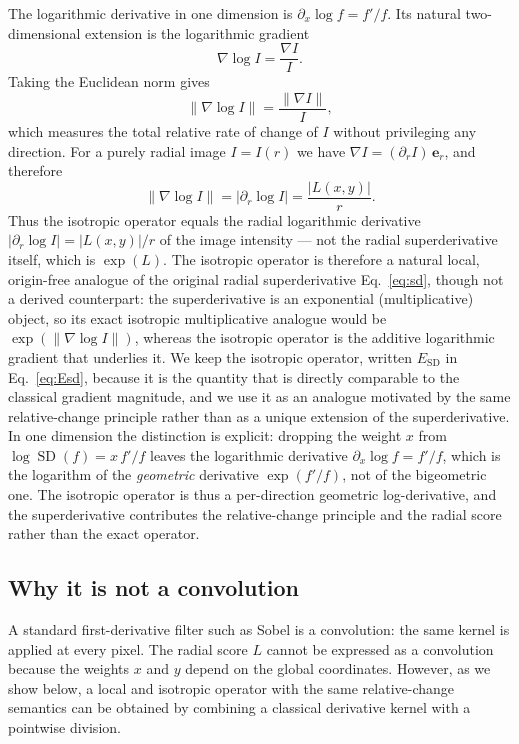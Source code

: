 \documentclass[conference]{IEEEtran}
\DeclareMathOperator{\SD}{SD}
\begin{document}
The logarithmic derivative in one dimension is
$\partial_x\log f = f'/f$.  Its natural two-dimensional extension is the
logarithmic gradient
\begin{equation}
\nabla\log I = \frac{\nabla I}{I}.
\label{eq:loggradvec}
\end{equation}
Taking the Euclidean norm gives
\begin{equation}
\|\nabla\log I\| = \frac{\|\nabla I\|}{I},
\label{eq:normloggrad}
\end{equation}
which measures the total relative rate of change of $I$ without privileging
any direction.  For a purely radial image $I=I(r)$ we have
$\nabla I=(\partial_r I)\,\mathbf{e}_r$, and therefore
\begin{equation}
\|\nabla\log I\| = |\partial_r\log I| = \frac{|L(x,y)|}{r}.
\label{eq:radialrelation}
\end{equation}
Thus the isotropic operator equals the radial logarithmic derivative
$|\partial_r\log I| = |L(x,y)|/r$ of the image intensity --- not
the radial superderivative itself, which is $\exp(L)$.  The isotropic operator
is therefore a natural local, origin-free analogue of the original radial
superderivative Eq.~\eqref{eq:sd}, though not a derived counterpart: the
superderivative is an exponential (multiplicative) object, so its exact isotropic
multiplicative analogue would be $\exp(\|\nabla\log I\|)$, whereas the isotropic
operator is the additive logarithmic gradient that underlies it.  We keep the
isotropic operator, written $E_{\mathrm{SD}}$ in Eq.~\eqref{eq:Esd}, because it is
the quantity that is directly comparable to the classical gradient magnitude, and we
use it as an analogue motivated by the same relative-change principle rather than as
a unique extension of the superderivative.  In one dimension the distinction is explicit: dropping the weight
$x$ from $\log\SD(f)=x\,f'/f$ leaves the logarithmic derivative
$\partial_x\log f=f'/f$, which is the logarithm of the \emph{geometric}
derivative $\exp(f'/f)$, not of the bigeometric one.  The isotropic operator is
thus a per-direction geometric log-derivative, and the superderivative contributes
the relative-change principle and the radial score rather than the exact operator.

\subsection{Why it is not a convolution}
A standard first-derivative filter such as Sobel is a convolution: the same
kernel is applied at every pixel.  The radial score $L$ cannot be expressed
as a convolution because the weights $x$ and $y$ depend on the global
coordinates.  However, as we show below, a local and isotropic operator
with the same relative-change semantics can be obtained by combining a
classical derivative kernel with a pointwise division.
\end{document}
